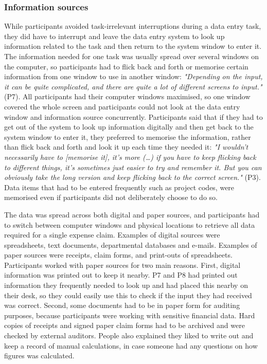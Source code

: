 \subsubsection{Information sources}
While participants avoided task-irrelevant interruptions during a data entry task, they did have to interrupt and leave the data entry system to look up information related to the task and then return to the system window to enter it. The information needed for one task was usually spread over several windows on the computer, so participants had to flick back and forth or memorise certain information from one window to use in another window: \textit{"Depending on the input, it can be quite complicated, and there are quite a lot of different screens to input."} (P7). All participants had their computer windows maximised, so one window covered the whole screen and participants could not look at the data entry window and information source concurrently. Participants said that if they had to get out of the system to look up information digitally and then get back to the system window to enter it, they preferred to memorise the information, rather than flick back and forth and look it up each time they needed it: \textit{"I wouldn't necessarily have to [memorise it], it's more (…) if you have to keep flicking back to different things, it's sometimes just easier to try and remember it. But you can obviously take the long version and keep flicking back to the correct screen."} (P3). Data items that had to be entered frequently such as project codes, were memorised even if participants did not deliberately choose to do so.

The data was spread across both digital and paper sources, and participants had to switch between computer windows and physical locations to retrieve all data required for a single expense claim. Examples of digital sources were spreadsheets, text documents, departmental databases and e-mails. Examples of paper sources were receipts, claim forms, and print-outs of spreadsheets. Participants worked with paper sources for two main reasons. First, digital information was printed out to keep it nearby. P7 and P8 had printed out information they frequently needed to look up and had placed this nearby on their desk, so they could easily use this to check if the input they had received was correct. Second, some documents had to be in paper form for auditing purposes, because participants were working with sensitive financial data. Hard copies of receipts and signed paper claim forms had to be archived and were checked by external auditors. People also explained they liked to write out and keep a record of manual calculations, in case someone had any questions on how figures was calculated.

